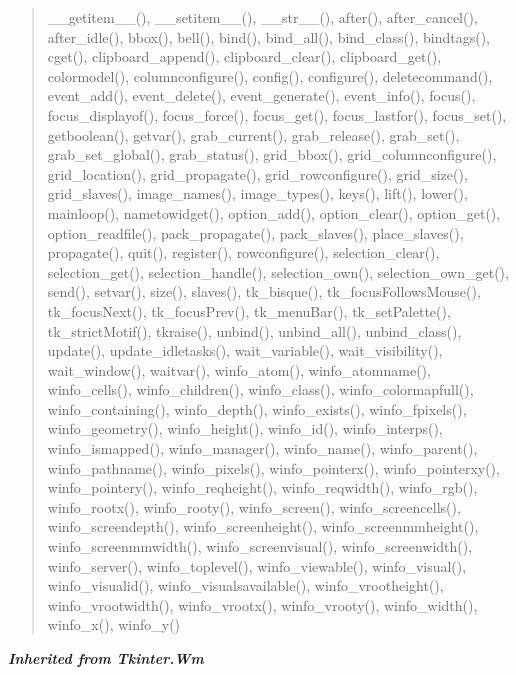 \begin{quote}
\_\_getitem\_\_(), \_\_setitem\_\_(), \_\_str\_\_(), after(), after\_cancel(), after\_idle(), bbox(), bell(), bind(), bind\_all(), bind\_class(), bindtags(), cget(), clipboard\_append(), clipboard\_clear(), clipboard\_get(), colormodel(), columnconfigure(), config(), configure(), deletecommand(), event\_add(), event\_delete(), event\_generate(), event\_info(), focus(), focus\_displayof(), focus\_force(), focus\_get(), focus\_lastfor(), focus\_set(), getboolean(), getvar(), grab\_current(), grab\_release(), grab\_set(), grab\_set\_global(), grab\_status(), grid\_bbox(), grid\_columnconfigure(), grid\_location(), grid\_propagate(), grid\_rowconfigure(), grid\_size(), grid\_slaves(), image\_names(), image\_types(), keys(), lift(), lower(), mainloop(), nametowidget(), option\_add(), option\_clear(), option\_get(), option\_readfile(), pack\_propagate(), pack\_slaves(), place\_slaves(), propagate(), quit(), register(), rowconfigure(), selection\_clear(), selection\_get(), selection\_handle(), selection\_own(), selection\_own\_get(), send(), setvar(), size(), slaves(), tk\_bisque(), tk\_focusFollowsMouse(), tk\_focusNext(), tk\_focusPrev(), tk\_menuBar(), tk\_setPalette(), tk\_strictMotif(), tkraise(), unbind(), unbind\_all(), unbind\_class(), update(), update\_idletasks(), wait\_variable(), wait\_visibility(), wait\_window(), waitvar(), winfo\_atom(), winfo\_atomname(), winfo\_cells(), winfo\_children(), winfo\_class(), winfo\_colormapfull(), winfo\_containing(), winfo\_depth(), winfo\_exists(), winfo\_fpixels(), winfo\_geometry(), winfo\_height(), winfo\_id(), winfo\_interps(), winfo\_ismapped(), winfo\_manager(), winfo\_name(), winfo\_parent(), winfo\_pathname(), winfo\_pixels(), winfo\_pointerx(), winfo\_pointerxy(), winfo\_pointery(), winfo\_reqheight(), winfo\_reqwidth(), winfo\_rgb(), winfo\_rootx(), winfo\_rooty(), winfo\_screen(), winfo\_screencells(), winfo\_screendepth(), winfo\_screenheight(), winfo\_screenmmheight(), winfo\_screenmmwidth(), winfo\_screenvisual(), winfo\_screenwidth(), winfo\_server(), winfo\_toplevel(), winfo\_viewable(), winfo\_visual(), winfo\_visualid(), winfo\_visualsavailable(), winfo\_vrootheight(), winfo\_vrootwidth(), winfo\_vrootx(), winfo\_vrooty(), winfo\_width(), winfo\_x(), winfo\_y()
\end{quote}

\large{\textbf{\textit{Inherited from Tkinter.Wm}}}

